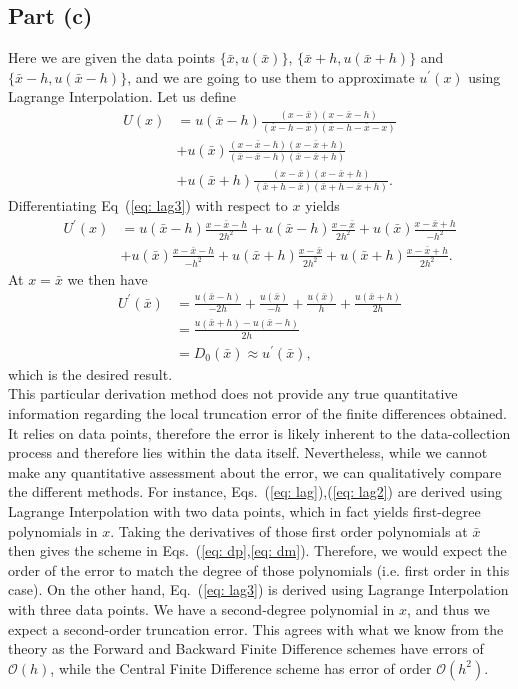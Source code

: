 \documentclass[aps,prl,preprint,groupedaddress]{revtex4-1}
\newcommand{\xbar}{\bar{x}}
\begin{document}
\subsection{Part (c)}
Here we are given the data points $\{\bar{x},u(\bar{x})\}$, $\{\bar{x}+h,u(\bar{x}+h)\}$ and $\{\bar{x}-h,u(\bar{x}-h)\}$, and we are going to use them to approximate $u^{\prime}(x)$ using Lagrange Interpolation. Let us define
\begin{align}\label{eq: lag3}
U(x) &= u(\xbar-h)\frac{(x-\xbar)(x-\xbar-h)}{(\xbar-h-\xbar)(\xbar-h-\xbar-x)}\nonumber\\
&+ u(\xbar)\frac{(x-\xbar-h)(x-\xbar+h)}{(\xbar-\xbar-h)(\xbar-\xbar+h)}\nonumber\\
&+ u(\xbar+h)\frac{(x-\xbar)(x-\xbar+h)}{(\xbar+h-\xbar)(\xbar+h-\xbar+h)}.
\end{align}
Differentiating Eq~(\ref{eq: lag3}) with respect to $x$ yields
\begin{align}
U^{\prime}(x) &= u(\xbar-h)\frac{x-\xbar-h}{2h^{2}}+u(\xbar-h)\frac{x-\xbar}{2h^{2}}+u(\xbar)\frac{x-\xbar+h}{-h^{2}}\nonumber\\
&+u(\xbar)\frac{x-\xbar-h}{-h^{2}}+u(\xbar+h)\frac{x-\xbar}{2h^{2}}+u(\xbar+h)\frac{x-\xbar+h}{2h^{2}}.
\end{align}
At $x=\xbar$ we then have
\begin{align}\label{eq: d0}
U^{\prime}(\xbar) &= \frac{u(\xbar-h)}{-2h}+\frac{u(\xbar)}{-h}+\frac{u(\xbar)}{h}+\frac{u(\xbar+h)}{2h}\nonumber\\
&= \frac{u(\xbar+h)-u(\xbar-h)}{2h}\nonumber\\
&= D_{0}(\xbar)\approx{u^{\prime}(\xbar)}, 
\end{align}
which is the desired result.\\
This particular derivation method does not provide any true quantitative information regarding the local truncation error of the finite differences obtained. It relies on data points, therefore the error is likely inherent to the data-collection process and therefore lies within the data itself. Nevertheless, while we cannot make any quantitative assessment about the error, we can qualitatively compare the different methods. For instance, Eqs.~(\ref{eq: lag}),(\ref{eq: lag2}) are derived using Lagrange Interpolation with two data points, which in fact yields first-degree polynomials in $x$. Taking the derivatives of those first order polynomials at $\xbar$ then gives the scheme in Eqs.~(\ref{eq: dp},\ref{eq: dm}). Therefore, we would expect the order of the error to match the degree of those polynomials (i.e. first order in this case). On the other hand, Eq.~(\ref{eq: lag3}) is derived using Lagrange Interpolation with three data points. We have a second-degree polynomial in $x$, and thus we expect a second-order truncation error. This agrees with what we know from the theory as the Forward and Backward Finite Difference schemes have errors of $\mathcal{O}(h)$, while the Central Finite Difference scheme has error of order $\mathcal{O}(h^{2})$.
\end{document}
